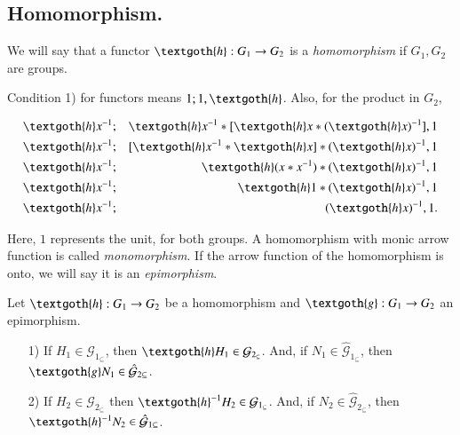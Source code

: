 \documentclass [12pt]{book}
\begin{document}
		\subsection{Homomorphism.}

\begin{definition} We will say that a functor $\textgoth{h}:G_{1}\rightarrow G_{2}$ is a \textit{homomorphism} if $G_{1},G_{2}$ are groups.\end{definition} 

Condition 1) for functors means $1;1,\textgoth{h}$. Also, for the product in $G_{2}$,

\begin{eqnarray}\nonumber \textgoth{h}x^{-1}&;&\textgoth{h}x^{-1}*[\textgoth{h}x*(\textgoth{h}x)^{-1}],1
\\\nonumber \textgoth{h}x^{-1}&;&[\textgoth{h}x^{-1}*\textgoth{h}x]*(\textgoth{h}x)^{-1},1
\\\nonumber\textgoth{h}x^{-1}&;&\textgoth{h}(x*x^{-1})*(\textgoth{h}x)^{-1},1\\\nonumber\textgoth{h}x^{-1}&;&\textgoth{h}
1*(\textgoth{h}x)^{-1},1\\\nonumber\textgoth{h}x^{-1}&;&(\textgoth{h}x)^{-1}
,1.\end{eqnarray}

Here, $1$ represents the unit, for both groups. A homomorphism with monic arrow function is called \textit{monomorphism}. If the arrow function of the homomorphism is onto, we will say it is an \textit{epimorphism}.

\begin{theorem}Let $\textgoth{h}:G_{1}\rightarrow G_{2}$ be a homomorphism and $\textgoth{g}:G_{1}\rightarrow G_{2}$ an epimorphism.\makebox[5pt][]{}\mbox {}\begin{itemize}\item[1)]If $H_{1}\in\mathcal{G}_{1_{\subseteq}}$, then $\textgoth{h}H_{1}\in\mathcal{G}_{2_{\subseteq}}$. And, if $N_{1}\in\hat{\mathcal{G}}_{1_{\subseteq}}$, then $\textgoth{g}N_{1}\in\hat{\mathcal{G}}_{2\subseteq}$. \item[2)]If $H_{2}\in\mathcal{G}_{2_{\subseteq}}$ then $\textgoth{h}^{-1}H_{2}\in\mathcal{G}_{1_{\subseteq}}$. And, if $N_{2}\in\hat{\mathcal{G}}_{2_{\subseteq}}$, then $\textgoth{h}^{-1}N_{2}\in\hat{\mathcal{G}}_{1\subseteq}$.\end{itemize}\end{theorem}
\end{document}
